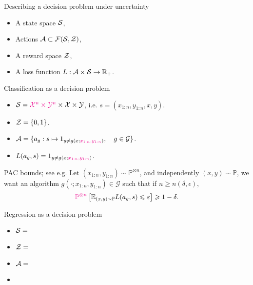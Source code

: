 \documentclass[10pt]{beamer}
\begin{document}
\begin{frame}{Describing a decision problem under uncertainty}
\begin{itemize}
  \vfill\item A state space $\mathcal{S}$,\\
  \vfill\item Actions $\mathcal{A} \subset \mathcal{F}(\mathcal{S}, \mathcal{Z})$,\\
  \vfill\item A reward space $\mathcal{Z}$,\\
  \vfill\item A loss function $L:\mathcal{A}\times \mathcal{S} \rightarrow \mathbb{R}_+$.\\
\end{itemize}
\end{frame}

\begin{frame}{Classification as a decision problem}
\begin{itemize}
\item $\mathcal{S} = \textcolor{magenta}{\mathcal{X}^n\times\mathcal{Y}^n}\times \mathcal{X}\times \mathcal{Y}$, i.e. $s = (x_{1:n}, y_{1:n}, x, y)$.
\item $\mathcal{Z} = \{0,1\}$.
\item $\mathcal{A} = \{a_g: s\mapsto 1_{y\neq g(x; \textcolor{magenta}{x_{1:n}, y_{1:n}})}, \quad g\in\mathcal{G}\}$.
\item $L(a_g,s) = 1_{y\neq g(x; \textcolor{magenta}{x_{1:n}, y_{1:n}})}$.
\end{itemize}
\vfill
\begin{block}{PAC bounds; see e.g. \citep{ShBe14}}
Let $(x_{1:n},y_{1:n})\sim \mathbb{P}^{\otimes n}$, and independently $(x,y)\sim \mathbb{P}$, we want an algorithm $g(\cdot; x_{1:n}, y_{1:n})\in\mathcal G$ such that if $n\geq n(\delta,\epsilon)$,
$$
\textcolor{magenta}{\mathbb{P}^{\otimes n}}\left[\mathbb{E}_{(x,y)\sim \mathbb P} L(a_g,s) \leqslant \varepsilon\right] \geqslant 1-\delta.
$$
\end{block}\end{frame}

\begin{frame}{Regression as a decision problem}
  \begin{itemize}
  \item $\mathcal{S} = $
  \item $\mathcal{Z} = $
  \item $\mathcal{A} = $
  \item
  \end{itemize}
  \blank
\end{frame}
\end{document}
